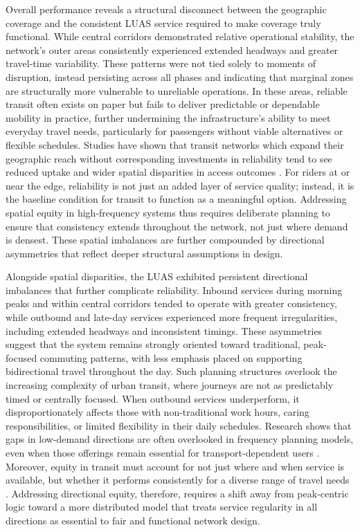     Overall performance reveals a structural disconnect between the geographic coverage and the consistent LUAS service required to make coverage truly functional. While central corridors demonstrated relative operational stability, the network’s outer areas consistently experienced extended headways and greater travel-time variability. These patterns were not tied solely to moments of disruption, instead persisting across all phases and indicating that marginal zones are structurally more vulnerable to unreliable operations. In these areas, reliable transit often exists on paper but fails to deliver predictable or dependable mobility in practice, further undermining the infrastructure’s ability to meet everyday travel needs, particularly for passengers without viable alternatives or flexible schedules. Studies have shown that transit networks which expand their geographic reach without corresponding investments in reliability tend to see reduced uptake and wider spatial disparities in access outcomes \parencite{santos2013externalities}. For riders at or near the edge, reliability is not just an added layer of service quality; instead, it is the baseline condition for transit to function as a meaningful option. Addressing spatial equity in high-frequency systems thus requires deliberate planning to ensure that consistency extends throughout the network, not just where demand is densest. These spatial imbalances are further compounded by directional asymmetries that reflect deeper structural assumptions in design.

    Alongside spatial disparities, the LUAS exhibited persistent directional imbalances that further complicate reliability. Inbound services during morning peaks and within central corridors tended to operate with greater consistency, while outbound and late-day services experienced more frequent irregularities, including extended headways and inconsistent timings. These asymmetries suggest that the system remains strongly oriented toward traditional, peak-focused commuting patterns, with less emphasis placed on supporting bidirectional travel throughout the day. Such planning structures overlook the increasing complexity of urban transit, where journeys are not as predictably timed or centrally focused. When outbound services underperform, it disproportionately affects those with non-traditional work hours, caring responsibilities, or limited flexibility in their daily schedules. Research shows that gaps in low-demand directions are often overlooked in frequency planning models, even when those offerings remain essential for transport-dependent users \parencite{jiang2022reliability}. Moreover, equity in transit must account for not just where and when service is available, but whether it performs consistently for a diverse range of travel needs \parencite{martens2016justice}. Addressing directional equity, therefore, requires a shift away from peak-centric logic toward a more distributed model that treats service regularity in all directions as essential to fair and functional network design.

